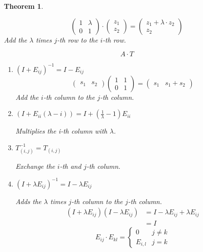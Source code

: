 \documentclass[a4paper,landscape,twocolumn]{article}
\newtheorem{theorem}{Theorem}
\begin{document}
\begin{theorem}
\begin{enumerate}
      \[
        \begin{pmatrix}
          1 & \lambda \\
          0 & 1
        \end{pmatrix} \cdot
        \begin{pmatrix}
          z_1 \\
          z_2
        \end{pmatrix}
        =
        \begin{pmatrix}
          z_1 + \lambda \cdot z_2 \\
          z_2
        \end{pmatrix}
      \]
      Add the $\lambda$ times $j$-th row to the $i$-th row.
  \end{enumerate}
  \[ A \cdot T \]
  \begin{enumerate}
    \item $(I + E_{ij})^{-1} = I - E_{ij}$
      \[
        \begin{pmatrix}
          s_1 & s_2
        \end{pmatrix}
        \begin{pmatrix}
          1 & 1 \\
          0 & 1
        \end{pmatrix}
        =
        \begin{pmatrix}
          s_1 & s_1 + s_2
        \end{pmatrix}
      \]
      Add the $i$-th column to the $j$-th column.
    \item $(I + E_{ii}(\lambda - i)) = I + \left(\frac{1}{\lambda} - 1\right) E_{ii}$

      Multiplies the i-th column with $\lambda$.
    \item $T_{(i,j)}^{-1} = T_{(i,j)}$

      Exchange the $i$-th and $j$-th column.
    \item $(I + \lambda E_{ij})^{-1} = I - \lambda E_{ij}$

      Adds the $\lambda$ times $j$-th column to the $j$-th column.
      \begin{align*}
        (I + \lambda E_{ij}) (I - \lambda E_{ij})
          &= I - \lambda E_{ij} + \lambda E_{ij} \\
          &= I
      \end{align*}
      \[
        E_{ij} \cdot E_{kl} = \begin{cases}
          0 & j \neq k \\
          E_{i,l} & j = k
        \end{cases}
      \]
  \end{enumerate}
\end{theorem}
\end{document}

